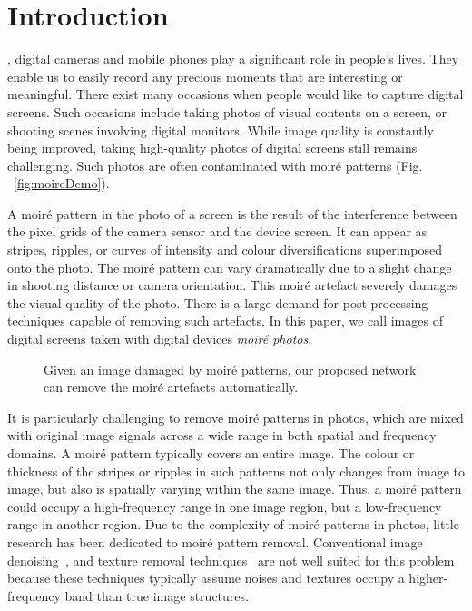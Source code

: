 \documentclass[journal]{IEEEtran}
\begin{document}
\IEEEpeerreviewmaketitle


\maketitle


\section{Introduction}
, digital cameras and mobile phones play a significant role in people's lives. They enable us to easily record any precious moments that are interesting or meaningful. There exist many occasions when people would like to capture digital screens. Such occasions include taking photos of visual contents on a screen, or shooting scenes involving digital monitors. While image quality is constantly being improved, taking high-quality photos of digital screens still remains challenging. Such photos are often contaminated with moir\'{e} patterns (Fig. ~\ref{fig:moireDemo}).

A moir\'{e} pattern in the photo of a screen is the result of the interference between the pixel grids of the camera sensor and the device screen. It can appear as stripes, ripples, or curves of intensity and colour diversifications superimposed onto the photo. The moir\'{e} pattern can vary dramatically due to a slight change in shooting distance or camera orientation. This moir\'{e} artefact severely damages the visual quality of the photo. There is a large demand for post-processing techniques capable of removing such artefacts. In this paper, we call images of digital screens taken with digital devices \textit{moir\'{e} photos}.


\begin{figure}[t]
\begin{center}
\end{center}
\caption{Given an image damaged by moir\'{e} patterns, our proposed network can remove the moir\'{e} artefacts automatically.}

\label{fig:teaser}
\end{figure}

It is particularly challenging to remove moir\'{e} patterns in photos, which are mixed with original image signals across a wide range in both spatial and frequency domains. A moir\'{e} pattern typically covers an entire image. The colour or thickness of the stripes or ripples in such patterns not only changes from image to image, but also is spatially varying within the same image. Thus, a moir\'{e} pattern could occupy a high-frequency range in one image region, but a low-frequency range in another region. Due to the complexity of moir\'{e} patterns in photos, little research has been dedicated to moir\'{e} pattern removal. Conventional image denoising~\cite{chen2013fast}, and texture removal techniques~\cite{xu2012structure,cho2014bilateral} are not well suited for this problem because these techniques typically assume noises and textures occupy a higher-frequency band than true image structures.
\end{document}
